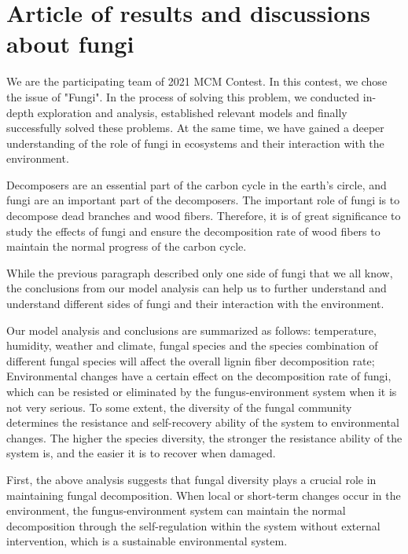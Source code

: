 \pagestyle{fancy}
\section{Article of results and discussions about fungi}

{\fontsize{14pt}{25pt}\selectfont 

We are the participating team of 2021 MCM Contest. In this contest, we chose the issue of "Fungi". In the process of solving this problem, we conducted in-depth exploration and analysis, established relevant models and finally successfully solved these problems. At the same time, we have gained a deeper understanding of the role of fungi in ecosystems and their interaction with the environment.

Decomposers are an essential part of the carbon cycle in the earth's circle, and fungi are an important part of the decomposers. The important role of fungi is to decompose dead branches and wood fibers. Therefore, it is of great significance to study the effects of fungi and ensure the decomposition rate of wood fibers to maintain the normal progress of the carbon cycle.

While the previous paragraph described only one side of fungi that we all know, the conclusions from our model analysis can help us to further understand and understand different sides of fungi and their interaction with the environment.

Our model analysis and conclusions are summarized as follows: temperature, humidity, weather and climate, fungal species and the species combination of different fungal species will affect the overall lignin fiber decomposition rate; Environmental changes have a certain effect on the decomposition rate of fungi, which can be resisted or eliminated by the fungus-environment system when it is not very serious. To some extent, the diversity of the fungal community determines the resistance and self-recovery ability of the system to environmental changes. The higher the species diversity, the stronger the resistance ability of the system is, and the easier it is to recover when damaged.

First, the above analysis suggests that fungal diversity plays a crucial role in maintaining fungal decomposition. When local or short-term changes occur in the environment, the fungus-environment system can maintain the normal decomposition through the self-regulation within the system without external intervention, which is a sustainable environmental system.

}
